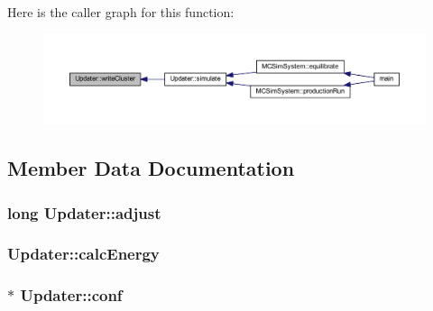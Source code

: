 Here is the caller graph for this function\+:\nopagebreak
\begin{figure}[H]
\begin{center}
\leavevmode
\includegraphics[width=350pt]{class_updater_ad3395745c795331dbc976d209d7a1ece_icgraph}
\end{center}
\end{figure}




\subsection{Member Data Documentation}
\hypertarget{class_updater_af7b8b8f187a21d9683cd4fea2dd5fbd7}{
\subsubsection[{adjust}]{\setlength{\rightskip}{0pt plus 5cm}long Updater\+::adjust\hspace{0.3cm}{\ttfamily [private]}}}\label{class_updater_af7b8b8f187a21d9683cd4fea2dd5fbd7}
\hypertarget{class_updater_a647ada4927eb26b2fd53a6db0167ff15}{
\subsubsection[{calc\+Energy}]{ Updater\+::calc\+Energy\hspace{0.3cm}{\ttfamily [private]}}}\label{class_updater_a647ada4927eb26b2fd53a6db0167ff15}
\hypertarget{class_updater_a2f0686ac33efa6f1712431b37d0c1ba1}{
\subsubsection[{conf}]{$\ast$ Updater\+::conf\hspace{0.3cm}{\ttfamily [private]}}}\label{class_updater_a2f0686ac33efa6f1712431b37d0c1ba1}
